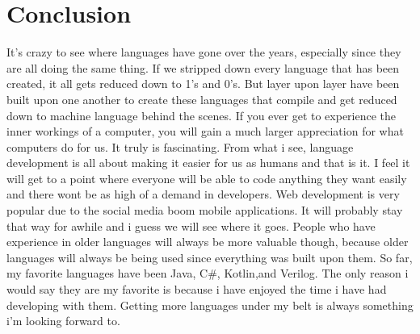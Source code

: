 \documentclass[letterpaper, 10 pt, conference]{IEEEtran}
\begin{document}
\section{Conclusion}
It's crazy to see where languages have gone over the years, especially since they are all doing the same thing. If we stripped down every language that has been created, it all gets reduced down to 1's and 0's. But layer upon layer have been built upon one another to create these languages that compile and get reduced down to machine language behind the scenes. If you ever get to experience the inner workings of a computer, you will gain a much larger appreciation for what computers do for us. It truly is fascinating. From what i see, language development is all about making it easier for us as humans and that is it. I feel it will get to a point where everyone will be able to code anything they want easily and there wont be as high of a demand in developers. Web development is very popular due to the social media boom mobile applications. It will probably stay that way for awhile and i guess we will see where it goes. People who have experience in older languages will always be more valuable though, because older languages will always be being used since everything was built upon them. So far, my favorite languages have been Java, C\#, Kotlin,and Verilog. The only reason i would say they are my favorite is because i have enjoyed the time i have had developing with them. Getting more languages under my belt is always something i'm looking forward to.



\end{document}
